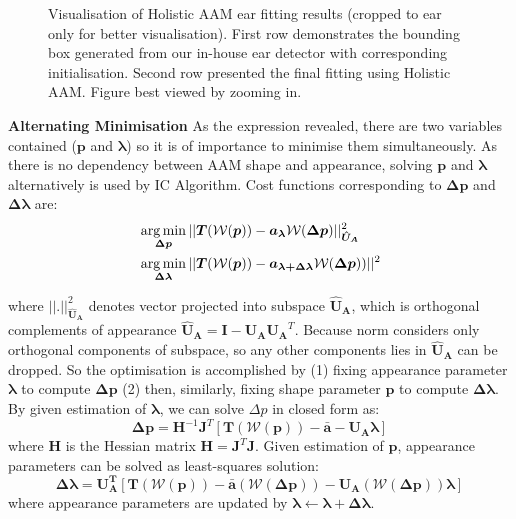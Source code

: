 \begin{figure}[!t]
    \caption{Visualisation of Holistic AAM ear fitting results (cropped to ear only for better visualisation). First row demonstrates the bounding box generated from our in-house ear detector with corresponding initialisation. Second row presented the final fitting using Holistic AAM. Figure best viewed by zooming in.}
    \label{fig:fitting_visualise}
\end{figure}


\noindent\textbf{Alternating Minimisation}
As the expression revealed, there are two variables contained ($\bm{p}$ and $\bm{\lambda}$) so it is of importance to minimise them simultaneously. As there is no dependency between AAM shape and appearance, solving $\bm{p}$ and $\bm{\lambda}$ alternatively is used by IC Algorithm. Cost functions corresponding to $\bm{\Delta p}$ and $\bm{\Delta \lambda}$ are:
\begin{align}
    \label{eq:aamfittingappearancevariance_ear}
    & \operatorname*{arg\,min}_{\bm{\Delta p}}||\bm{T}(\mathcal{W}(\bm{p}))-\bm{a_\lambda}\mathcal{W}(\bm{\Delta p})||^2_{\bm{\hat{U}_A}} \\
    & \operatorname*{arg\,min}_{\bm{\Delta\lambda}}||\bm{T}(\mathcal{W}(\bm{p}))-\bm{a_{\lambda+\Delta \lambda}}{\mathcal{W}({\bm{\Delta p}})})||^2
\end{align}

where $||.||^2_{\bm{\hat{U}_A}}$ denotes vector projected into subspace $\bm{\hat{U}_A}$, which is orthogonal complements of appearance $\bm{\hat{U}_A}=\bm{I}-\bm{U_A} \bm{U_A}^T$. Because norm considers only orthogonal components of subspace, so any other components lies in $\bm{\hat{U}_A}$ can be dropped. So the optimisation is accomplished by (1) fixing appearance parameter $\bm{\lambda}$ to compute $\bm{\Delta p}$ (2) then, similarly, fixing shape parameter $\bm{p}$ to compute $\bm{\Delta\lambda}$. By given estimation of $\bm{\lambda}$, we can solve $\Delta p$ in closed form as: 
\begin{equation}
    \label{eq:dpic_ear}
    \bm{\Delta p}=\bm{H}^{-1}\bm{J}^T[\bm{T}(\mathcal{W}(\bm{p}))-\bm{\bar{a}}-\bm{U_A}\bm{\lambda}]
\end{equation}
where $\bm{H}$ is the Hessian matrix $\bm{H}=\bm{J}^T\bm{J}$. Given estimation of $\bm{p}$, appearance parameters can be solved as least-squares solution:
\begin{equation}
    \label{eq:lambdaic}
    \bm{\Delta \lambda}=\bm{U_A^T}[\bm{T}(\mathcal{W}(\bm{p}))-\bm{\bar{a}}(\mathcal{W}(\bm{\Delta p}))-\bm{U_A}(\mathcal{W}(\bm{\Delta p}))\bm{\lambda}]
\end{equation}
where appearance parameters are updated by $\bm{\lambda}\leftarrow\bm{\lambda}+\bm{\Delta \lambda}$. 

